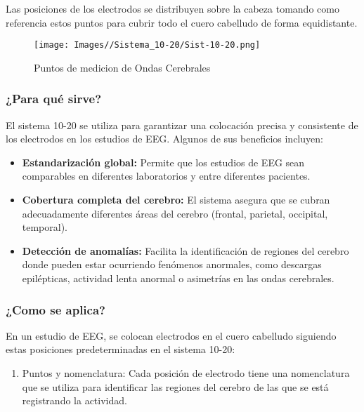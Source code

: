 \documentclass{article}
\begin{document}
Las posiciones de los electrodos se distribuyen sobre la cabeza tomando como referencia estos puntos para cubrir todo el cuero cabelludo de forma equidistante.

\begin{figure}[H]
    \centering
    \texttt{[image: Images//Sistema\_10-20/Sist-10-20.png]}
    \caption{Puntos de medicion de Ondas Cerebrales}
    \label{fig:enter-label}
\end{figure}

\subsubsection{¿Para qué sirve?}
El sistema 10-20 se utiliza para garantizar una colocación precisa y consistente de los electrodos en los estudios de EEG. Algunos de sus beneficios incluyen:

\begin{itemize}

    \item \textbf{Estandarización global:} Permite que los estudios de EEG sean comparables en diferentes laboratorios y entre diferentes pacientes.
    \item \textbf{Cobertura completa del cerebro:} El sistema asegura que se cubran adecuadamente diferentes áreas del cerebro (frontal, parietal, occipital, temporal).
    \item \textbf{Detección de anomalías:} Facilita la identificación de regiones del cerebro donde pueden estar ocurriendo fenómenos anormales, como descargas epilépticas, actividad lenta anormal o asimetrías en las ondas cerebrales.
    
\end{itemize}

\subsubsection{¿Como se aplica?}

En un estudio de EEG, se colocan electrodos en el cuero cabelludo siguiendo estas posiciones predeterminadas en el sistema 10-20:

\begin{enumerate}
    \item Puntos y nomenclatura: Cada posición de electrodo tiene una nomenclatura que se utiliza para identificar las regiones del cerebro de las que se está registrando la actividad.
\end{enumerate}
\end{document}
